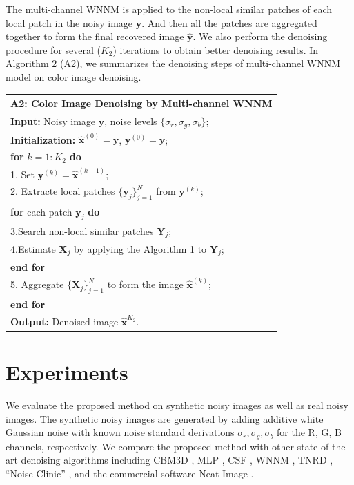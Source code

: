 \documentclass[10pt,twocolumn,letterpaper]{article}
\begin{document}
The multi-channel WNNM is applied to the non-local similar patches of each local patch in the noisy image $\mathbf{y}$. And then all the patches are aggregated together to form the final recovered image $\hat{\mathbf{y}}$. We also perform the denoising procedure for several ($K_{2}$) iterations to obtain better denoising results. In Algorithm 2 (A2), we summarizes the  denoising steps of multi-channel WNNM model on color image denoising.
\begin{table}\label{alg1}
\begin{tabular}{l}
\hline
\textbf{A2}: Color Image Denoising by Multi-channel WNNM
\\
\hline
\textbf{Input:} Noisy image $\mathbf{y}$, noise levels $\{\sigma_{r}, \sigma_{g}, \sigma_{b}\}$;
\\
\textbf{Initialization:} $\hat{\mathbf{x}}^{(0)}=\mathbf{y}$, $\mathbf{y}^{(0)}=\mathbf{y}$;
\\
\textbf{for} $k = 1:K_{2}$ \textbf{do}
\\
1. Set $\mathbf{y}^{(k)}=\hat{\mathbf{x}}^{(k-1)}$;
\\
2. Extracte local patches $\{\mathbf{y}_{j}\}_{j=1}^{N}$ from $\mathbf{y}^{(k)}$;
\\
\quad\textbf{for} each patch $\mathbf{y}_{j}$ \textbf{do}
\\
3.\quad Search non-local similar patches $\mathbf{Y}_{j}$;
\\
4.\quad Estimate $\mathbf{X}_{j}$ by applying the Algorithm 1 to $\mathbf{Y}_{j}$;
\\
\quad\textbf{end for}
\\
5. Aggregate $\{\mathbf{X}_{j}\}_{j=1}^{N}$ to form the image $\hat{\mathbf{x}}^{(k)}$;
\\
\textbf{end for}
\\
\textbf{Output:} Denoised image $\hat{\mathbf{x}}^{K_{2}}$.
\\
\hline
\end{tabular}
\end{table}

\section{Experiments}
We evaluate the proposed method on synthetic noisy images as well as real noisy images. The synthetic noisy images are generated by adding additive white Gaussian noise with known noise standard derivations $\sigma_{r}, \sigma_{g}, \sigma_{b}$ for the R, G, B channels, respectively. We compare the proposed method with other state-of-the-art denoising algorithms including CBM3D \cite{bm3d,cbm3d}, MLP \cite{mlp}, CSF \cite{csf}, WNNM \cite{wnnm}, TNRD \cite{chen2015learning}, ``Noise Clinic'' \cite{noiseclinic,ncwebsite}, and the commercial software Neat Image \cite{neatimage}.
\end{document}
